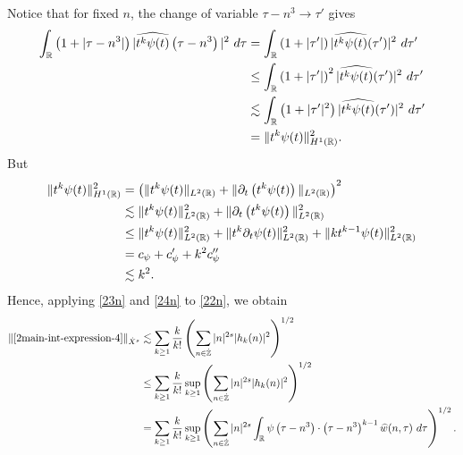 %
%
Notice that for fixed $n$, the change of variable $\tau - n^3 \to \tau'$
gives
%
%
\begin{equation}
	\label{23n}
	\begin{split}
		\int_{\mathbb{R}} \left( 1 + | \tau - n^3 | \right) | \widehat{t^{k}
		\psi(t)}\left( \tau - n^3 \right) |^2 \ d \tau
		& = \int_{\mathbb{R}} \left( 1 + |\tau'| \right) | \widehat{t^k \psi(t)}(\tau') |^2 \
		d \tau'
		\\
		& \le \int_{\mathbb{R}} \left( 1 + |\tau'| \right)^2 | \widehat{t^k \psi(t)}(\tau')
		|^2 \ d \tau'
		\\
		& \lesssim \int_{\mathbb{R}} \left( 1 + | \tau' |^2 \right) | \widehat{t^{k}
		\psi(t)}(\tau') |^2 \ d \tau'
		\\
		& = \|t^k \psi(t) \|_{H^1(\mathbb{R})}^2.
	\end{split}
\end{equation}
%
%
But
%
%
\begin{equation}
	\label{24n}
	\begin{split}
		\|t^k \psi(t) \|_{H^1(\mathbb{R})}^2
		& = \left( \|t^k \psi(t)\|_{L^2(\mathbb{R})} + \|\partial_t \left( t^k \psi(t)
		\right)\|_{L^2(\mathbb{R})} \right)^2
		\\
		& \lesssim \|t^{k}\psi(t) \|_{L^2(\mathbb{R})}^2 + \|\partial_t \left (t^{k}
		\psi(t) \right )\|_{L^2(\mathbb{R})}^2
		\\
		& \le \|t^k \psi(t) \|_{L^2(\mathbb{R})}^2 + \|t^k \partial_t \psi(t)
		\|_{L^2(\mathbb{R})}^2 + \|k t^{k -1} \psi(t) \|_{L^2(\mathbb{R})}^2
		\\
		& = c_{\psi} + c_{\psi}' + k^2 c_{\psi}''
		\\
		& \lesssim k^2.
	\end{split}
\end{equation}
%
%
Hence, applying \eqref{23n} and \eqref{24n} to \eqref{22n}, we obtain
%
\begin{equation}
	\label{25n}
	\begin{split}
		\|\eqref{2main-int-expression-4} \|_{\dot{X}^s}
		& \lesssim
		\sum_{k \ge 1} \frac{k}{k!} \left( \sum_{n \in \dot{\mathbb{Z}}} |n|^{2s} | h_k(n) |^2 
		\right)^{1/2}
		\\
		& \le \sum_{k \ge 1} \frac{k}{k!}
		 \sup_{k \ge 1} \left( \sum_{n \in \dot{\mathbb{Z}}} |n|^{2s} | 
		h_k(n) |^2 \right)^{1/2}
		\\
		& = \sum_{k \ge 1} \frac{k}{k!}  \sup_{k \ge 1} 
		\left( \sum_{n \in \dot{\mathbb{Z}}} |n|^{2s} \int_{\mathbb{R}} 
		\psi\left( \tau - n^3 \right) \cdot \left( \tau - n^3 
		\right)^{k -1} \widehat{w}(n, \tau) \ d \tau \right)^{1/2}.
	\end{split}
\end{equation}
%
